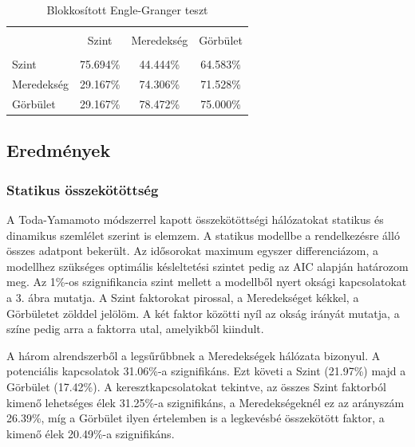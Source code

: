 \documentclass[12pt,bibliography=totoc]{article}
\begin{document}
\begin{table}[H]
\caption{Blokkosított Engle-Granger teszt} %

\centering%
\begin{tabular}{l | ccc}%
\hline\hline \\ [-1.5ex]                         %

	&	Szint 	&	Meredekség	&	Görbület	\\
\hline \\ [-1.5ex]  
Szint	&	75.694\%	&	44.444\%	&	64.583\%	\\
Meredekség	&	29.167\%	&	74.306\%	&	71.528\%	\\
Görbület	&	29.167\%	&	78.472\%	&	75.000\%	\\

\hline            
\end{tabular}
\label{table:nonlin}%
\end{table}



\subsection{Eredmények}

\subsubsection{Statikus összekötöttség}

A Toda-Yamamoto módszerrel kapott összekötöttségi hálózatokat statikus és dinamikus szemlélet szerint is elemzem. A statikus modellbe a rendelkezésre álló összes adatpont bekerült. Az idősorokat maximum egyszer differenciázom, a modellhez szükséges optimális késleltetési szintet pedig az AIC alapján határozom meg. Az 1\%-os szignifikancia szint mellett a modellből nyert oksági kapcsolatokat a 3. ábra mutatja. A Szint faktorokat pirossal, a Meredekséget kékkel, a Görbületet zölddel jelölöm. A két faktor közötti nyíl az okság irányát mutatja, a színe pedig arra a faktorra utal, amelyikből kiindult.

A három alrendszerből a legsűrűbbnek a Meredekségek hálózata bizonyul. A potenciális kapcsolatok 31.06\%-a szignifikáns. Ezt követi a Szint (21.97\%) majd a Görbület (17.42\%). A keresztkapcsolatokat tekintve, az összes Szint faktorból kimenő lehetséges élek 31.25\%-a szignifikáns, a Meredekségeknél ez az arányszám 26.39\%, míg a Görbület ilyen értelemben is a legkevésbé összekötött faktor, a kimenő élek 20.49\%-a szignifikáns.
\end{document}
